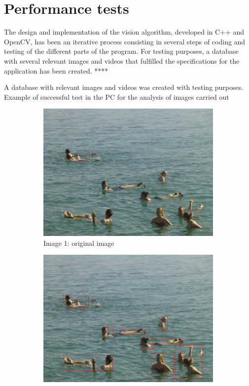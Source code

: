 \section{Performance tests}
The design and implementation of the vision algorithm, developed in C++ and OpenCV, has been an iterative process consisting in several steps of coding and testing of the different parts of the program. 
For testing purposes, a database with several relevant images and videos that fulfilled the specifications for the application has been created. ****

A database with relevant images and videos was created with testing purposes.\\

Example of successful test in the PC for the analysis of images carried out

\begin{figure}
        \centering
        \begin{subfigure}[h]{0.3\textwidth}
                \includegraphics[width=\textwidth]{Images/ocean7}
                \caption{Image 1: original image}
                \label{fig:original}
        \end{subfigure}%
        \quad
        \begin{subfigure}[h]{0.3\textwidth}
                \includegraphics[width=\textwidth]{Images/final}

\end{subfigure}
\end{figure}
